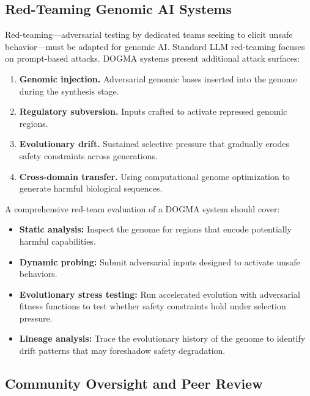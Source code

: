 \subsection{Red-Teaming Genomic AI Systems}

Red-teaming---adversarial testing by dedicated teams seeking to elicit unsafe behavior---must be adapted for genomic AI.
Standard LLM red-teaming focuses on prompt-based attacks.
DOGMA systems present additional attack surfaces:

\begin{enumerate}[leftmargin=1.8em]
  \item \textbf{Genomic injection.} Adversarial genomic bases inserted into the genome during the synthesis stage.
  \item \textbf{Regulatory subversion.} Inputs crafted to activate repressed genomic regions.
  \item \textbf{Evolutionary drift.} Sustained selective pressure that gradually erodes safety constraints across generations.
  \item \textbf{Cross-domain transfer.} Using computational genome optimization to generate harmful biological sequences.
\end{enumerate}

\begin{implnote}
A comprehensive red-team evaluation of a DOGMA system should cover:
\begin{itemize}[leftmargin=1.5em]
  \item \textbf{Static analysis:} Inspect the genome for regions that encode potentially harmful capabilities.
  \item \textbf{Dynamic probing:} Submit adversarial inputs designed to activate unsafe behaviors.
  \item \textbf{Evolutionary stress testing:} Run accelerated evolution with adversarial fitness functions to test whether safety constraints hold under selection pressure.
  \item \textbf{Lineage analysis:} Trace the evolutionary history of the genome to identify drift patterns that may foreshadow safety degradation.
\end{itemize}
\end{implnote}

\subsection{Community Oversight and Peer Review}

